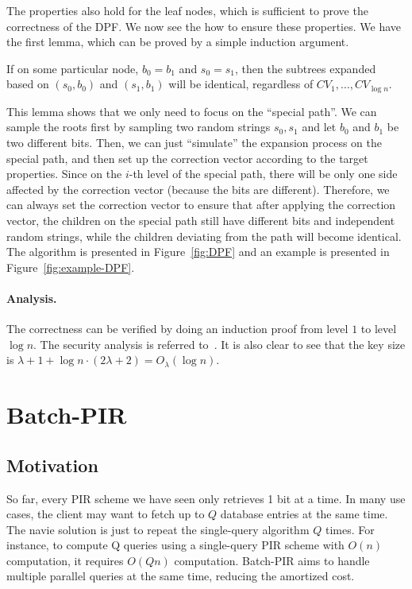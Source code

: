 The properties also hold for the leaf nodes, which is sufficient to prove the correctness of the DPF.
We now see the how to ensure these properties.
We have the first lemma, which can be proved by a simple induction argument.

\begin{lemma}
    If on some particular node, $b_0=b_1$ and $s_0=s_1$, then the subtrees expanded based on $(s_0,b_0)$ and $(s_1,b_1)$ will be identical, regardless of $CV_1,\dots,CV_{\log n}$.
\end{lemma}

This lemma shows that we only need to focus on the ``special path''. We can sample the roots first by sampling two random strings $s_0,s_1$ and let $b_0$ and $b_1$ be two different bits. 
Then, we can just ``simulate'' the expansion process on the special path, and then set up the correction vector according to the target properties. 
Since on the $i$-th level of the special path, there will be only one side affected by the correction vector (because the bits are different).
Therefore, we can always set the correction vector to ensure that after applying the correction vector, the children on the special path still have different bits and independent random strings, while the children deviating from the path will become identical.
The algorithm is presented in Figure~\ref{fig:DPF} and an example is presented in Figure~\ref{fig:example-DPF}.


\paragraph{Analysis.}
The correctness can be verified by doing an induction proof from level $1$ to level $\log n$.
The security analysis is referred to~\cite{boyle2016function}. 
It is also clear to see that the key size is $\lambda+1+\log n\cdot (2\lambda+2)=O_\lambda(\log n)$.



 \section{Batch-PIR}

 \subsection{Motivation}
    So far, every PIR scheme we have seen only retrieves 1 bit at a time. 
    In many use cases, the client may want to fetch up to $Q$ database entries at the same time. 
    The navie solution is just to repeat the single-query algorithm $Q$ times.
    For instance, to compute Q queries using a single-query PIR scheme with $O(n)$ computation, it requires $O(Qn)$ computation.
    Batch-PIR aims to handle multiple parallel queries at the same time, reducing the
     amortized cost.
     
